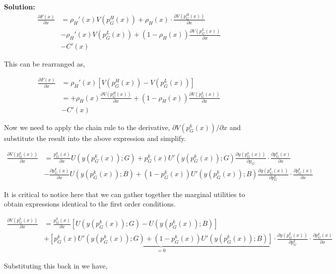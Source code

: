 \documentclass[a4paper, 12pt]{article}
\newenvironment{solution}{ \noindent \textbf{Solution: \medskip}}{}
\begin{document}
\begin{solution}
\begin{align}
	\frac{\partial F(x)}{\partial x} &= \rho_H'(x) V(p_G^H(x)) + \rho_H(x) \cdot \frac{\partial V(p_G^H(x))}{\partial x} \nonumber \\
	& - \rho_H'(x) V(p_G^L(x)) + (1 - \rho_H(x)) \frac{\partial V(p_G^L(x))}{\partial x} \nonumber \\
	& - C'(x) \nonumber
\end{align}

This can be rearranged as,

\begin{align}
	\frac{\partial F(x)}{\partial x} &= \rho_H'(x)\left[ V(p_G^H(x)) - V(p_G^L(x))\right] \nonumber \\
	&= + \rho_H(x) \frac{\partial V(p_G^H(x))}{\partial x} + (1-\rho_H(x))\frac{\partial V(p_G^L(x))}{\partial x} \nonumber \\
	& - C'(x) \nonumber
\end{align}

Now we need to apply the chain rule to the derivative, $\partial V(p_G^k(x)) / \partial x$ and substitute the result into the above expression and simplify.

\begin{align}
	\frac{\partial V(p_G^k(x))}{\partial x} &= \frac{p_G^k(x)}{\partial x} U(y(p_G^k(x)); G) + p_G^k(x) U'(y(p_G^k(x));G)\frac{\partial y(p_G^k(x))}{\partial p_G}\cdot \frac{\partial p_G^k(x)}{\partial x} \nonumber \\
	&- \frac{\partial p_G^k(x)}{\partial x} U(y(p_G^k(x));B) + (1-p_G^k(x)) U'(y(p_G^k(x));B) \frac{\partial y(p_G^k(x))}{\partial p_G^k} \cdot \frac{\partial p_G^k(x)}{\partial x} \nonumber
\end{align}

It is critical to notice here that we can gather together the marginal utilities to obtain expressions identical to the first order conditions.

\begin{align}
	\frac{\partial V(p_G^k(x))}{\partial x} &= \frac{p_G^k(x)}{\partial x} \left[ U(y(p_G^k(x));G) - U(y(p_G^k(x));B) \right] \nonumber \\
	&+ \underbrace{\left[p_G^k(x) U'(y(p_G^k(x)); G) + (1-p_G^k(x))U'(y(p_G^k(x));B)\right]}_{=0} \cdot\frac{\partial y(p_G^k(x))}{\partial p_G^k}\cdot \frac{\partial p_G^k(x)}{\partial x} \nonumber
\end{align}

Substituting this back in we have,


\end{solution}
\end{document}
